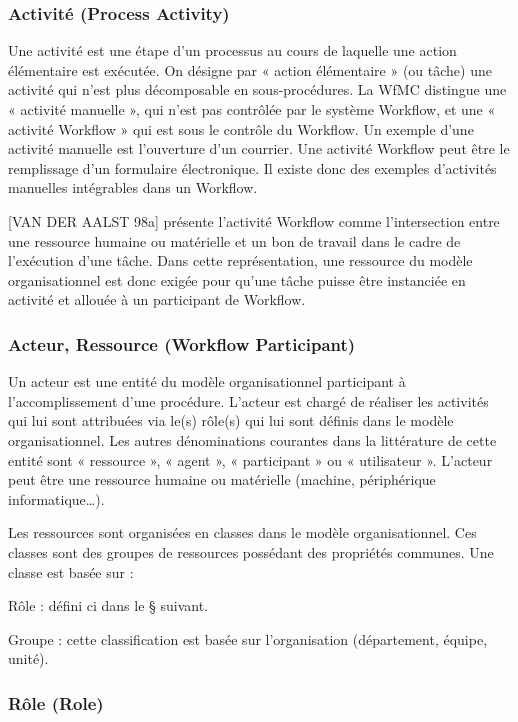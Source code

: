  	 
 	 \subsubsection{Activité (Process Activity) }
 	 Une activité est une étape d’un processus au cours de laquelle une action élémentaire est exécutée. On désigne par « action élémentaire » (ou tâche) une activité qui n’est plus décomposable en sous-procédures. La WfMC distingue une « activité manuelle », qui n’est pas contrôlée par le système Workflow, et une « activité Workflow » qui est sous le contrôle du Workflow. Un exemple d’une activité manuelle est l’ouverture d’un courrier. Une activité Workflow peut être le remplissage d’un formulaire électronique. Il existe donc des exemples d’activités manuelles intégrables dans un Workflow. 
 	 
 	 [VAN DER AALST 98a] présente l’activité Workflow comme l’intersection entre une ressource humaine ou matérielle et un bon de travail dans le cadre de l’exécution d’une tâche. Dans cette représentation, une ressource du modèle organisationnel est donc exigée pour qu’une tâche puisse être instanciée en activité et allouée à un participant de Workflow. 
 	 
 	 
 	 
 	  	 \subsubsection{ Acteur, Ressource (Workflow Participant) }
 	 
 	Un acteur est une entité du modèle organisationnel participant à l’accomplissement d’une procédure. L’acteur est chargé de réaliser les activités qui lui sont attribuées via le(s) rôle(s) qui lui sont définis dans le modèle organisationnel. Les autres dénominations courantes dans la littérature de cette entité sont « ressource », « agent », « participant » ou « utilisateur ». L’acteur peut être une ressource humaine ou matérielle (machine, périphérique informatique…).
 	 
 	 Les ressources sont organisées en classes dans le modèle organisationnel. Ces classes sont des groupes de ressources possédant des propriétés communes. Une classe est basée sur :
 	 
 	  Rôle : défini ci dans le § suivant. 
 	  
 	 Groupe : cette classification est basée sur l’organisation (département, équipe, unité). 
 	 
 	 \subsubsection{ Rôle (Role) }
 	 
